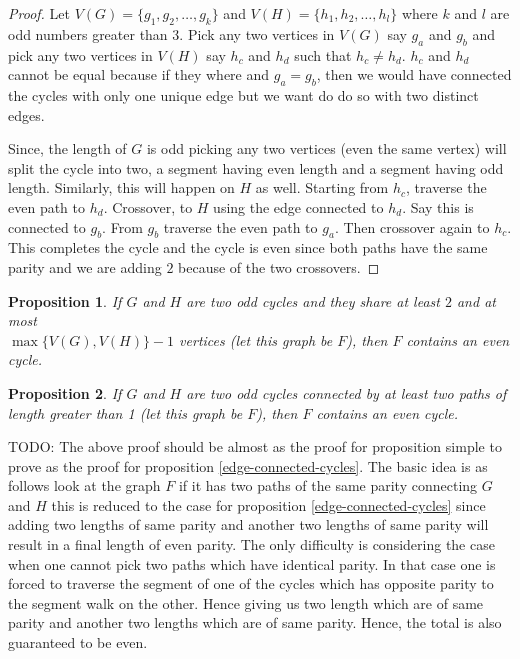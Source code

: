 \documentclass[12pt]{article}
\theoremstyle{plain}
\newtheorem{prop}{Proposition}
\begin{document}
\begin{proof}
    Let $V(G) = \{g_1, g_2, \ldots, g_k\}$ and $V(H) = \{h_1,
    h_2, \ldots, h_l\}$ where $k$ and $l$ are odd numbers
    greater than $3$. Pick any two vertices in $V(G)$ say $g_a$
    and $g_b$ and pick any two vertices in $V(H)$ say $h_c$ and
    $h_d$ such that $h_c \not = h_d$. $h_c$ and $h_d$ cannot be
    equal because if they where and $g_a = g_b$, then we would
    have connected the cycles with only one unique edge but we
    want do do so with two distinct edges.

    Since, the length of $G$ is odd picking any two vertices
    (even the same vertex) will split the cycle into two, a
    segment having even length and a segment having odd length.
    Similarly, this will happen on $H$ as well. Starting from
    $h_c$, traverse the even path to $h_d$. Crossover, to $H$
    using the edge connected to $h_d$. Say this is connected to
    $g_b$. From $g_b$ traverse the even path to $g_a$. Then
    crossover again to $h_c$. This completes the cycle and the
    cycle is even since both paths have the same parity and we
    are adding $2$ because of the two crossovers.
\end{proof}

\begin{prop}
If $G$ and $H$ are two odd cycles and they share at least $2$ and at most \\ $\max\{V(G), V(H)\} - 1$ vertices (let
this graph be $F$), then $F$ contains an even cycle. 
\end{prop}

\begin{prop}
If $G$ and $H$ are two odd cycles connected by at least two
paths of length greater than 1 (let this graph be $F$), then $F$
contains an even cycle. 
\end{prop}

TODO: The above proof should be almost as the proof for
proposition simple to prove as the proof for proposition
\ref{edge-connected-cycles}. The basic idea is as follows look
at the graph $F$ if it has two paths of the same parity
connecting $G$ and $H$ this is reduced to the case for
proposition \ref{edge-connected-cycles} since adding two lengths
of same parity and another two lengths of same parity will
result in a final length of even parity. The only difficulty is
considering the case when one cannot pick two paths which have
identical parity. In that case one is forced to traverse the
segment of one of the cycles which has opposite parity to the
segment walk on the other. Hence giving us two length which are
of same parity and another two lengths which are of same parity.
Hence, the total is also guaranteed to be even.
\end{document}
